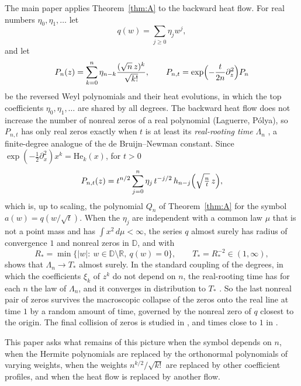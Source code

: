 \documentclass[11pt]{amsart}
\theoremstyle{definition}
\theoremstyle{remark}
\numberwithin{equation}{section}
\newcommand{\R}{\mathbb{R}}
\newcommand{\D}{\mathbb{D}}
\newcommand{\He}{\mathrm{He}}
\begin{document}
The main paper \cite{Main} applies Theorem~\ref{thm:A} to the backward heat flow. For real numbers $\eta_0,\eta_1,\dots$ let
\begin{equation}\label{eq:kac}
q(w)=\sum_{j\ge0}\eta_jw^j,
\end{equation}
and let
\begin{equation}\label{eq:reversed}
P_n(z)=\sum_{k=0}^{n}\eta_{n-k}\frac{(\sqrt n\,z)^k}{\sqrt{k!}},\qquad P_{n,t}=\exp\Bigl(-\frac{t}{2n}\partial_z^2\Bigr)P_n
\end{equation}
be the reversed Weyl polynomials and their heat evolutions, in which the top coefficients $\eta_0,\eta_1,\dots$ are shared by all degrees. The backward heat flow does not increase the number of nonreal zeros of a real polynomial (Laguerre, P\'olya), so $P_{n,t}$ has only real zeros exactly when $t$ is at least its \emph{real-rooting time} $\Lambda_n$ \cite[Lemma~\ref{M-lem:heat}]{Main}, a finite-degree analogue of the de Bruijn--Newman constant. Since $\exp(-\frac12\partial_x^2)x^k=\He_k(x)$, for $t>0$
\begin{equation}\label{eq:heat-hermite}
P_{n,t}(z)=t^{n/2}\sum_{j=0}^{n}\eta_j\,t^{-j/2}\,h_{n-j}\Bigl(\sqrt{\tfrac nt}\,z\Bigr),
\end{equation}
which is, up to scaling, the polynomial $Q_n$ of Theorem~\ref{thm:A} for the symbol $a(w)=q(w/\sqrt t)$. When the $\eta_j$ are independent with a common law $\mu$ that is not a point mass and has $\int x^2\,d\mu<\infty$, the series $q$ almost surely has radius of convergence $1$ and nonreal zeros in $\D$, and with
\begin{equation}\label{eq:Rstar}
R_*=\min\{|w|:\ w\in\D\setminus\R,\ q(w)=0\},\qquad T_*=R_*^{-2}\in(1,\infty),
\end{equation}
\cite[Theorem~\ref{M-thm:heat}]{Main} shows that $\Lambda_n\to T_*$ almost surely. In the standard coupling of the degrees, in which the coefficients $\xi_k$ of $z^k$ do not depend on $n$, the real-rooting time has for each $n$ the law of $\Lambda_n$, and it converges in distribution to $T_*$ \cite[Theorem~\ref{M-cor:weyl}]{Main}. So the last nonreal pair of zeros survives the macroscopic collapse of the zeros onto the real line at time $1$ \cite[Theorem~2.1]{HHJK} by a random amount of time, governed by the nonreal zero of $q$ closest to the origin. The final collision of zeros is studied in \cite{Main}, and times close to $1$ in \cite{CompB}.

This paper asks what remains of this picture when the symbol depends on $n$, when the Hermite polynomials are replaced by the orthonormal polynomials of varying weights, when the weights $n^{k/2}/\sqrt{k!}$ are replaced by other coefficient profiles, and when the heat flow is replaced by another flow.
\end{document}
